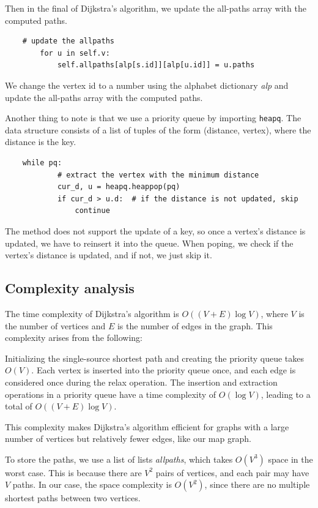 \documentclass[UTF8]{ctexart}
\begin{document}
Then in the final of Dijkstra's algorithm, we update the all-paths array with the computed paths.
\begin{lstlisting}
    # update the allpaths
        for u in self.v:
            self.allpaths[alp[s.id]][alp[u.id]] = u.paths
\end{lstlisting}
We change the vertex id to a number using the alphabet dictionary \textit{alp} and update the all-paths array with the computed paths.

Another thing to note is that we use a priority queue by importing \texttt{heapq}.
The data structure consists of a list of tuples of the form (distance, vertex), where the distance is the key.
\begin{lstlisting}
    while pq:
            # extract the vertex with the minimum distance
            cur_d, u = heapq.heappop(pq)
            if cur_d > u.d:  # if the distance is not updated, skip
                continue
\end{lstlisting}
The method does not support the update of a key, so once a vertex's distance is updated, we have to reinsert it into the queue.
When poping, we check if the vertex's distance is updated, and if not, we just skip it.


\subsection*{Complexity analysis}
The time complexity of Dijkstra's algorithm is \( O((V + E) \log V) \), where \( V \) is the number of vertices and \( E \) is the number of edges in the graph. This complexity arises from the following:

Initializing the single-source shortest path and creating the priority queue takes \( O(V) \).
Each vertex is inserted into the priority queue once, and each edge is considered once during the relax operation. The insertion and extraction operations in a priority queue have a time complexity of \( O(\log V) \), leading to a total of \( O((V + E) \log V) \).

This complexity makes Dijkstra's algorithm efficient for graphs with a large number of vertices but relatively fewer edges, like our map graph.

To store the paths, we use a list of lists \textit{allpaths}, which takes \( O(V^3) \) space in the worst case. This is because there are \( V^2 \) pairs of vertices, and each pair may have \( V \) paths. In our case, the space complexity is \( O(V^2) \), since there are no multiple shortest paths between two vertices.
\end{document}
